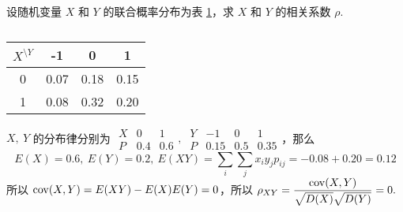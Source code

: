 \begin{example}
    设随机变量 $X$ 和 $Y$ 的联合概率分布为表 \ref{-101007018}，求 $X$ 和 $Y$ 的相关系数 $\rho.$
\end{example}
\begin{solution}
    \begin{minipage}{0.3\linewidth}
        \begin{table}[H]
            \centering
            \caption{}
            \label{-101007018}
            \begin{tabular}{c | c c c}
                $X^{\displaystyle\setminus Y}$ & -1   & 0    & 1    \\
                \midrule
                0                              & 0.07 & 0.18 & 0.15 \\
                1                              & 0.08 & 0.32 & 0.20
            \end{tabular}
        \end{table}
    \end{minipage}\hfill
    \begin{minipage}{0.66\linewidth}
        $X,~Y$ 的分布律分别为 $\begin{array}{c|cc}
                X & 0   & 1   \\\hline
                P & 0.4 & 0.6
            \end{array},~\begin{array}{c|ccc}
                Y & -1   & 0   & 1    \\\hline
                P & 0.15 & 0.5 & 0.35
            \end{array}$，那么
        $$E(X)=0.6,~E(Y)=0.2,~E(XY)=\sum_i\sum_j x_iy_j p_{ij}=-0.08+0.20=0.12$$
        所以 $\mathrm{cov}(X,Y)=E(XY)-E(X)E(Y)=0$，所以 $\rho_{XY}=\dfrac{\mathrm{cov}(X,Y)}{\sqrt{D(X)}\sqrt{D(Y)}}=0.$
    \end{minipage}
\end{solution}

